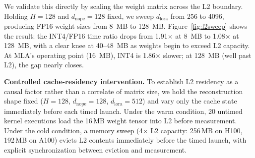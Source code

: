 \documentclass[10pt,twocolumn]{article}
\begin{document}
We validate this directly by scaling the weight matrix across the L2 boundary.  Holding $H{=}128$ and $d_\text{nope}{=}128$ fixed, we sweep $d_\text{lora}$ from 256 to 4096, producing FP16 weight sizes from 8~MB to 128~MB.  Figure~\ref{fig:l2sweep} shows the result: the INT4/FP16 time ratio drops from 1.91$\times$ at 8~MB to 1.08$\times$ at 128~MB, with a clear knee at 40--48~MB as weights begin to exceed L2 capacity.  At MLA's operating point (16~MB), INT4 is 1.86$\times$ slower; at 128~MB (well past L2), the gap nearly closes.

\textbf{Controlled cache-residency intervention.}  To establish L2 residency as a causal factor rather than a correlate of matrix size, we hold the reconstruction shape fixed ($H{=}128$, $d_\text{nope}{=}128$, $d_\text{lora}{=}512$) and vary only the cache state immediately before each timed launch.  Under the warm condition, 20 untimed kernel executions load the 16\,MB weight tensor into L2 before measurement.  Under the cold condition, a memory sweep (4$\times$ L2 capacity: 256\,MB on H100, 192\,MB on A100) evicts L2 contents immediately before the timed launch, with explicit synchronization between eviction and measurement.
\end{document}
